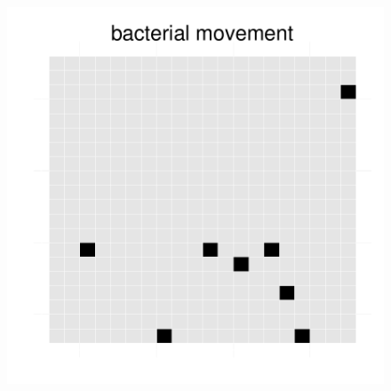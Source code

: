 \begin{figure}[h]
{\begin{minipage}[t]{0.3\textwidth}
  \end{minipage}
  \begin{minipage}[t]{0.3\textwidth}
    \includegraphics[width=\textwidth]{../results/beijerinckii_20x20_seed943_bac65.pdf}
  \end{minipage}
  }
\end{figure}
